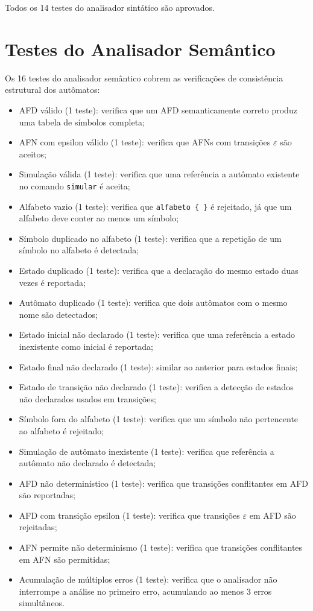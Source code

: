 \documentclass[
    12pt
    ,oneside
    ,a4paper
    ,chapter=TITLE
    ,section=TITLE
    ,sumario=abnt-6027-2012]{abntex2}
\begin{document}
Todos os 14 testes do analisador sintático são aprovados.

\section{Testes do Analisador Semântico}
\label{sec:res-sema}

Os 16 testes do analisador semântico cobrem as verificações de consistência estrutural
dos autômatos:

\begin{itemize}
    \item AFD válido (1 teste): verifica que um AFD semanticamente correto
          produz uma tabela de símbolos completa;
    \item AFN com epsilon válido (1 teste): verifica que AFNs com transições
          $\varepsilon$ são aceitos;
    \item Simulação válida (1 teste): verifica que uma referência a autômato
          existente no comando \texttt{simular} é aceita;
    \item Alfabeto vazio (1 teste): verifica que \texttt{alfabeto \{ \}} é rejeitado,
          já que um alfabeto deve conter ao menos um símbolo;
    \item Símbolo duplicado no alfabeto (1 teste): verifica que a repetição
          de um símbolo no alfabeto é detectada;
    \item Estado duplicado (1 teste): verifica que a declaração do mesmo
          estado duas vezes é reportada;
    \item Autômato duplicado (1 teste): verifica que dois autômatos com o
          mesmo nome são detectados;
    \item Estado inicial não declarado (1 teste): verifica que uma referência
          a estado inexistente como inicial é reportada;
    \item Estado final não declarado (1 teste): similar ao anterior para
          estados finais;
    \item Estado de transição não declarado (1 teste): verifica a detecção de
          estados não declarados usados em transições;
    \item Símbolo fora do alfabeto (1 teste): verifica que um símbolo não
          pertencente ao alfabeto é rejeitado;
    \item Simulação de autômato inexistente (1 teste): verifica que referência
          a autômato não declarado é detectada;
    \item AFD não determinístico (1 teste): verifica que transições
          conflitantes em AFD são reportadas;
    \item AFD com transição epsilon (1 teste): verifica que transições
          $\varepsilon$ em AFD são rejeitadas;
    \item AFN permite não determinismo (1 teste): verifica que transições
          conflitantes em AFN são permitidas;
    \item Acumulação de múltiplos erros (1 teste): verifica que o analisador
          não interrompe a análise no primeiro erro, acumulando ao menos 3 erros
          simultâneos.
\end{itemize}
\end{document}
